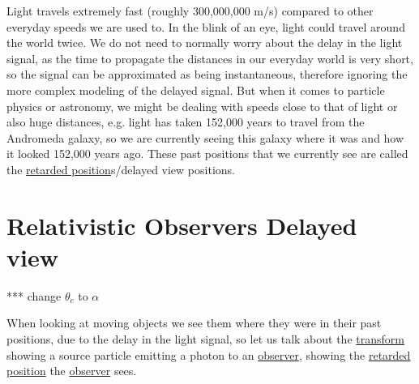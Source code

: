 Light travels extremely fast (roughly 300,000,000 m/s) compared to other everyday speeds we are used to. In the blink of an eye, light could travel around the world twice. We do not need to normally worry about the delay in the light signal, as the time to propagate the distances in our everyday world is very short, so the signal can be approximated as being instantaneous, therefore ignoring the more complex modeling of the delayed signal. But when it comes to particle physics or astronomy, we might be dealing with speeds close to that of light or also huge distances, e.g. light has taken 152,000 years to travel from the Andromeda galaxy, so we are currently seeing this galaxy where it was and how it looked 152,000 years ago. These past positions that we currently see are called the \hyperlink{def-retarded-position}{retarded position}s/delayed view positions.

\section{Relativistic Observers Delayed view}

*** change $\theta_c$ to $\alpha$

When looking at moving objects we see them where they were in their past positions, due to the delay in the light signal, so let us talk about the \hyperlink{def-transform}{transform} showing a source particle emitting a photon to an \hyperlink{def-observer}{observer}, showing the \hyperlink{def-retarded-position}{retarded position} the \hyperlink{def-observer}{observer} sees.

